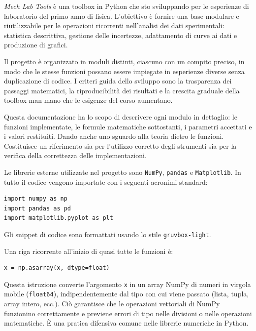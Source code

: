 
\textit{Mech Lab Tools} è una toolbox in Python che sto sviluppando per le esperienze di laboratorio del primo anno di fisica. L'obiettivo è fornire una base modulare e riutilizzabile per le operazioni ricorrenti nell'analisi dei dati sperimentali: statistica descrittiva, gestione delle incertezze, adattamento di curve ai dati e produzione di grafici.

Il progetto è organizzato in moduli distinti, ciascuno con un compito preciso, in modo che le stesse funzioni possano essere impiegate in esperienze diverse senza duplicazione di codice. I criteri guida dello sviluppo sono la trasparenza dei passaggi matematici, la riproducibilità dei risultati e la crescita graduale della toolbox man mano che le esigenze del corso aumentano.

Questa documentazione ha lo scopo di descrivere ogni modulo in dettaglio: le funzioni implementate, le formule matematiche sottostanti, i parametri accettati e i valori restituiti. Dando anche uno sguardo alla teoria dietro le funzioni. Costituisce un riferimento sia per l'utilizzo corretto degli strumenti sia per la verifica della correttezza delle implementazioni. 


Le librerie esterne utilizzate nel progetto sono \texttt{NumPy}, \texttt{pandas} e \texttt{Matplotlib}. In tutto il codice vengono importate con i seguenti acronimi standard:
\begin{verbatim}
import numpy as np
import pandas as pd
import matplotlib.pyplot as plt
\end{verbatim}

Gli snippet di codice sono formattati usando lo stile \texttt{gruvbox-light}.

Una riga ricorrente all'inizio di quasi tutte le funzioni è:
\begin{verbatim}
x = np.asarray(x, dtype=float)
\end{verbatim}
Questa istruzione converte l'argomento \texttt{x} in un array NumPy di numeri in virgola mobile (\texttt{float64}), indipendentemente dal tipo con cui viene passato (lista, tupla, array intero, ecc.). Ciò garantisce che le operazioni vettoriali di NumPy funzionino correttamente e previene errori di tipo nelle divisioni o nelle operazioni matematiche. È una pratica difensiva comune nelle librerie numeriche in Python.
\hfill
